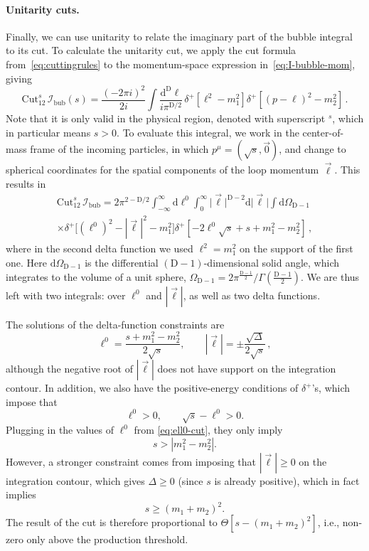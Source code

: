 \documentclass[12pt]{article}
\numberwithin{figure}{section}
\def \be {\begin{equation}}
\def \ee {\end{equation}}
\def \D {\mathrm{D}}
\def \d {\mathrm{d}}
\def \geq {\geqslant}
\def \I {\mathcal{I}}
\def \bubble {\mathrm{bub}}
\def \Cut {\mathrm{Cut}}
\begin{document}
	\paragraph{Unitarity cuts.}
	Finally, we can use unitarity to relate the imaginary part of the bubble integral to its cut. To calculate the unitarity cut, we apply the cut formula from~\eqref{eq:cuttingrules} to the momentum-space expression in~\eqref{eq:I-bubble-mom}, giving
	\be 
	    \Cut_{12}^s\, \I_{\bubble}(s) = \frac{\left(-2\pi i \right)^2 }{2 i} 
	    \int \frac{\d^\D \ell}{i \pi^{\D/2}}\,
	    \delta^+ \!\left[\ell^2-m_1^2\right] 
	    \delta^+ \!\left[(p-\ell)^2-m_2^2\right] \,.
	\ee 
	Note that it is only valid in the physical region, denoted with superscript ${}^s$, which in particular means $s>0$. To evaluate this integral, we work in the center-of-mass frame of the incoming particles, in which $p^\mu = (\sqrt{s},\vec{0})$, and change to spherical coordinates for the spatial components of the loop momentum $\vec{\ell}$. This results in
	\begin{multline} 
	    \Cut_{12}^s\, \I_{\bubble} =
	    2 \pi^{2-\D/2}
	    \int_{-\infty}^{\infty} \d \ell^0 
	    \int_0^\infty \vert \vec{\ell} \vert^{\D-2} \d \vert \vec{\ell}  \vert \int \d \Omega_{\D-1}
	    \\ \times
	    \delta^+ \!\big[(\ell^0)^2-|\vec{\ell}|^2-m_1^2\big] 
	    \delta^+ \!\left[-2 \ell^0 \sqrt{s} + s + m_1^2-m_2^2\right] \,,
	\end{multline} 
	where in the second delta function we used $\ell^2 = m_1^2$ on the support of the first one. Here $\d \Omega_{\D-1}$ is the differential $(\D{-}1)$-dimensional solid angle, which integrates to the volume of a unit sphere, $\Omega_{\D-1} = 2 \pi^{\frac{\D-1}{2}}/\Gamma(\frac{\D-1}{2})$. We are thus left with two integrals: over $\ell^0$ and $|\vec{\ell}|$, as well as two delta functions.
	
	The solutions of the delta-function constraints are
	\be\label{eq:ell0-cut}
    \ell^0 = \frac{s + m_1^2 - m_2^2}{2\sqrt{s}}, \qquad |\vec{\ell}| = \pm \frac{\sqrt{\Delta}}{2\sqrt{s}} \,,
	\ee
	although the negative root of $|\vec{\ell}|$ does not have support on the integration contour.
	In addition, we also have the positive-energy conditions of $\delta^+$'s, which impose that
	\be
	\ell^0 > 0, \qquad \sqrt{s} - \ell^0 > 0.
	\ee
	Plugging in the values of $\ell^0$ from \eqref{eq:ell0-cut}, they only imply
	\be
	s > |m_1^2 - m_2^2|.
	\ee
	However, a stronger constraint comes from imposing that $|\vec{\ell}| \geq 0$ on the integration contour, which gives $\Delta \geq 0$ (since $s$ is already positive), which in fact implies
	\be
	s \geq (m_1 + m_2)^2.
	\ee
	The result of the cut is therefore proportional to $\Theta[s - (m_1 {+} m_2)^2]$, i.e., non-zero only above the production threshold.
	
\end{document}
